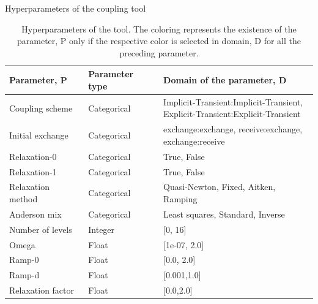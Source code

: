 \documentclass[10pt]{beamer}
\begin{document}
\begin{frame}{Hyperparameters of the coupling tool}
\small
\begin{table}[htbp]
\footnotesize
\begin{center}
\begin{tabular}{|l|l|l|}
\hline
\textbf{Parameter, P} & \textbf{Parameter type} & \textbf{Domain of the parameter, D} \\ \hline
Coupling scheme & Categorical &\makecell[l]{\color{brown}Implicit-Transient:Implicit-Transient\color{black},\\Explicit-Transient:Explicit-Transient} \\ \hline
Initial exchange & Categorical & \makecell[l]{exchange:exchange, receive:exchange, \\exchange:receive}  \\ \hline
\color{brown}Relaxation-0 & Categorical & \color{blue}True\color{black}, False \\ \hline
\color{brown}Relaxation-1 & Categorical & \color{blue}True\color{black}, False \\ \hline
\color{blue}Relaxation method & Categorical &\color{green} Quasi-Newton\color{black}, \color{red}Fixed\color{black}, Aitken, \color{magenta}Ramping \\ \hline
\color{green}Anderson mix& Categorical & Least squares, Standard, Inverse \\ \hline
\color{green}Number of levels  & Integer & [0, 16] \\ \hline
\color{green}Omega & Float & [1e-07, 2.0] \\ \hline
\color{magenta}Ramp-0 & Float & [0.0, 2.0] \\ \hline
\color{magenta}Ramp-d & Float & [0.001,1.0] \\ \hline
\color{red}Relaxation factor & Float & [0.0,2.0] \\ \hline
\end{tabular}
\end{center}
\caption{Hyperparameters of the tool. The coloring represents the existence of the parameter, P only if the respective color is selected in domain, D for all the preceding parameter.}
\label{table:parametertypes}
\end{table}
\end{frame}{}
\end{document}
